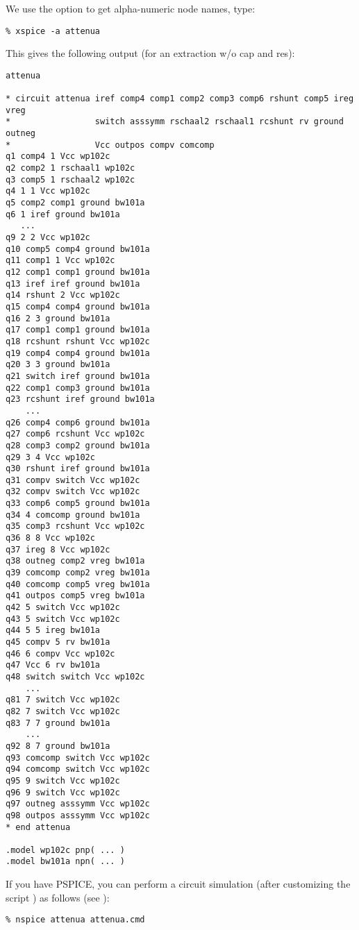 We use the  option to get alpha-numeric node names, type:
\small
\begin{Verbatim}
% xspice -a attenua
\end{Verbatim}
\normalsize
This gives the following output (for an extraction w/o cap and res):
\small \begin{Verbatim}[frame=single]
attenua

* circuit attenua iref comp4 comp1 comp2 comp3 comp6 rshunt comp5 ireg vreg
*                 switch asssymm rschaal2 rschaal1 rcshunt rv ground outneg
*                 Vcc outpos compv comcomp
q1 comp4 1 Vcc wp102c
q2 comp2 1 rschaal1 wp102c
q3 comp5 1 rschaal2 wp102c
q4 1 1 Vcc wp102c
q5 comp2 comp1 ground bw101a
q6 1 iref ground bw101a
   ...
q9 2 2 Vcc wp102c
q10 comp5 comp4 ground bw101a
q11 comp1 1 Vcc wp102c
q12 comp1 comp1 ground bw101a
q13 iref iref ground bw101a
q14 rshunt 2 Vcc wp102c
q15 comp4 comp4 ground bw101a
q16 2 3 ground bw101a
q17 comp1 comp1 ground bw101a
q18 rcshunt rshunt Vcc wp102c
q19 comp4 comp4 ground bw101a
q20 3 3 ground bw101a
q21 switch iref ground bw101a
q22 comp1 comp3 ground bw101a
q23 rcshunt iref ground bw101a
    ...
q26 comp4 comp6 ground bw101a
q27 comp6 rcshunt Vcc wp102c
q28 comp3 comp2 ground bw101a
q29 3 4 Vcc wp102c
q30 rshunt iref ground bw101a
q31 compv switch Vcc wp102c
q32 compv switch Vcc wp102c
q33 comp6 comp5 ground bw101a
q34 4 comcomp ground bw101a
q35 comp3 rcshunt Vcc wp102c
q36 8 8 Vcc wp102c
q37 ireg 8 Vcc wp102c
q38 outneg comp2 vreg bw101a
q39 comcomp comp2 vreg bw101a
q40 comcomp comp5 vreg bw101a
q41 outpos comp5 vreg bw101a
q42 5 switch Vcc wp102c
q43 5 switch Vcc wp102c
q44 5 5 ireg bw101a
q45 compv 5 rv bw101a
q46 6 compv Vcc wp102c
q47 Vcc 6 rv bw101a
q48 switch switch Vcc wp102c
    ...
q81 7 switch Vcc wp102c
q82 7 switch Vcc wp102c
q83 7 7 ground bw101a
    ...
q92 8 7 ground bw101a
q93 comcomp switch Vcc wp102c
q94 comcomp switch Vcc wp102c
q95 9 switch Vcc wp102c
q96 9 switch Vcc wp102c
q97 outneg asssymm Vcc wp102c
q98 outpos asssymm Vcc wp102c
* end attenua

.model wp102c pnp( ... )
.model bw101a npn( ... )
\end{Verbatim}
\normalsize
If you have PSPICE, you can perform a circuit simulation (after
customizing the script ) as follows (see ):
\small
\begin{Verbatim}
% nspice attenua attenua.cmd
\end{Verbatim}
\normalsize

